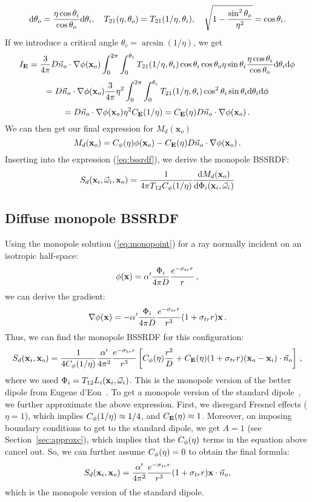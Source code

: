 \documentclass[10pt,a4paper]{article}
\begin{document}
$$
\text{d} \theta_o = \frac{\eta \cos\theta_i}{\cos\theta_o} \text{d} \theta_i,\ \ \ T_{21}(\eta,\theta_o) = T_{21}(1/\eta,\theta_i),\ \ \ \sqrt{1 - \frac{\sin^2\theta_o}{\eta^2}} = \cos\theta_i.
$$
If we introduce a critical angle $\theta_c = \arcsin(1/\eta)$, we get
$$
I_{\mathbf{E}} = \frac{3}{4\pi} D \vec{n}_o\cdot\nabla\phi(\mathbf{x}_o) \int_{0}^{2\pi}\int_{0}^{\theta_c} T_{21}(1/\eta,\theta_i) \cos\theta_i \cos \theta_o \eta \sin \theta_i \frac{\eta \cos\theta_i}{\cos\theta_o} \text{d} \theta_i \text{d} \phi
$$
$$
= D \vec{n}_o\cdot\nabla\phi(\mathbf{x}_o) \frac{3}{4\pi} \eta^2 \int_{0}^{2\pi}\int_{0}^{\theta_c} T_{21}(1/\eta,\theta_i) \cos^2\theta_i \sin \theta_i \text{d} \theta_i \text{d} \phi
$$
$$
= D \vec{n}_o\cdot\nabla\phi(\mathbf{x}_o) \eta^2 C_{\mathbf{E}}(1/\eta) = C_{\mathbf{E}}(\eta) D \vec{n}_o\cdot\nabla\phi(\mathbf{x}_o) \, .
$$
We can then get our final expression for  $M_d(\mathbf{x}_o)$
$$
M_d(\mathbf{x}_o) =  C_{\phi}(\eta) \phi(\mathbf{x}_o) - C_{\mathbf{E}}(\eta) D \vec{n}_o\cdot\nabla\phi(\mathbf{x}_o) \, .
$$
Inserting into the expression (\ref{eq:bssrdf}), we derive the monopole BSSRDF:
$$
S_d(\mathbf{x}_i, \vec{\omega}_i, \mathbf{x}_o)  =  \frac{1}{4\pi T_{12}C_{\phi}(1/\eta)} \frac{\text{d} M_d(\mathbf{x}_o)}{\text{d} \Phi_i(\mathbf{x}_i, \vec{\omega}_i)}
$$

\subsection{Diffuse monopole BSSRDF}

Using the monopole solution (\ref{eq:monopoint}) for a ray normally incident on an isotropic half-space:
$$
{\phi}(\mathbf{x}) = \alpha' \frac{\Phi_i}{4 \pi D} \frac{e^{-\sigma_{tr} r}}{r} \, ,
$$
we can derive the gradient:
$$
\nabla {\phi}(\mathbf{x}) =  -\alpha'\frac{\Phi_i}{4 \pi D} \frac{e^{-\sigma_{tr} r}}{r^3} (1 + \sigma_{tr} r) \mathbf{x} \, .
$$
Thus, we can find the monopole BSSRDF for this configuration:
$$
S_d(\mathbf{x}_i, \mathbf{x}_o)  = \frac{1}{4C_{\phi}(1/\eta)} \frac{\alpha'}{4 \pi^2} \frac{e^{-\sigma_{tr} r}}{r^3} \left[ C_{\phi}(\eta) \frac{r^2}{D} + C_{\mathbf{E}}(\eta) (1 + \sigma_{tr} r) (\mathbf{x}_o - \mathbf{x}_i) \cdot \vec{n}_o \right] \, ,
$$
where we used $\Phi_i = T_{12} L_i(\mathbf{x}_i, \vec{\omega}_i)$. This is the monopole version of the better dipole from Eugene d'Eon~\cite{deon12}. To get a monopole version of the standard dipole~\cite{farrell92,jensen01}, we further approximate the above expression. First, we disregard Fresnel effects ($\eta=1$), which implies $C_{\phi}(1/\eta) \approx 1/4$, and $C_{\mathbf{E}}(\eta) \approx 1$. Moreover, on imposing boundary conditions to get to the standard dipole, we get $A=1$ (see Section~\ref{sec:approxc}), which implies that the $C_{\phi}(\eta)$ terms in the equation above cancel out. So, we can further assume $C_{\phi}(\eta) = 0$ to obtain the final formula:
$$
S_d(\mathbf{x}_i, \mathbf{x}_o)  =  \frac{\alpha'}{4 \pi^2} \frac{e^{-\sigma_{tr} r}}{r^3} (1 + \sigma_{tr} r) \mathbf{x} \cdot \vec{n}_o,
$$
which is the monopole version of the standard dipole.
\end{document}
